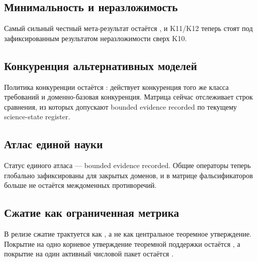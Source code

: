 \subsection{Минимальность и неразложимость}
Самый сильный честный мета-результат остаётся , и K11/K12 теперь стоят под зафиксированным результатом неразложимости сверх K10.

\subsection{Конкуренция альтернативных моделей}
Политика конкуренции остаётся : действует конкуренция того же класса требований и доменно-базовая конкуренция. Матрица сейчас отслеживает  строк сравнения, из которых  допускают bounded evidence recorded по текущему science-state register.

\subsection{Атлас единой науки}
Статус единого атласа — bounded evidence recorded. Общие операторы теперь глобально зафиксированы для закрытых доменов, и в матрице фальсификаторов больше не остаётся междоменных противоречий.

\subsection{Сжатие как ограниченная метрика}
В релизе сжатие трактуется как , а не как центральное теоремное утверждение. Покрытие на одно корневое утверждение теоремной поддержки остаётся , а покрытие на один активный числовой пакет остаётся .
